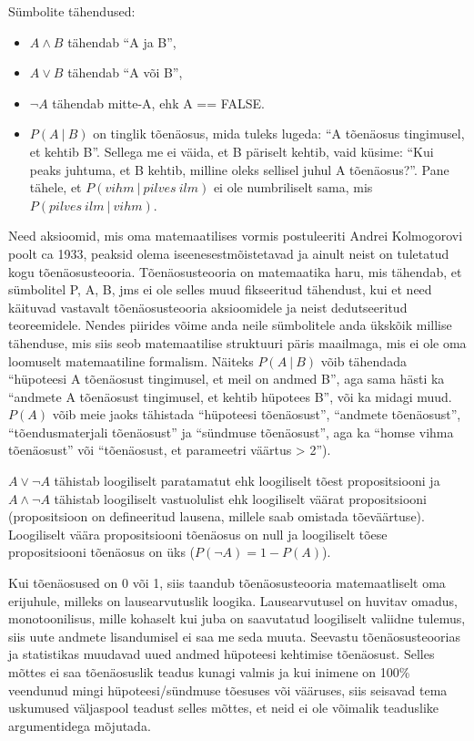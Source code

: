 \documentclass[]{book}
\begin{document}
Sümbolite tähendused:

\begin{itemize}
\item
  \(A \land B\) tähendab ``A ja B'',
\item
  \(A \lor B\) tähendab ``A või B'',
\item
  \(\lnot A\) tähendab mitte-A, ehk A == FALSE.
\item
  \(P(A~ \vert ~B)\) on tinglik tõenäosus, mida tuleks lugeda: ``A
  tõenäosus tingimusel, et kehtib B''. Sellega me ei väida, et B
  päriselt kehtib, vaid küsime: ``Kui peaks juhtuma, et B kehtib,
  milline oleks sellisel juhul A tõenäosus?''. Pane tähele, et
  \(P(vihm~\vert~pilves~ilm)\) ei ole numbriliselt sama, mis
  \(P(pilves~ilm~\vert~vihm)\).
\end{itemize}

Need aksioomid, mis oma matemaatilises vormis postuleeriti Andrei
Kolmogorovi poolt ca 1933, peaksid olema iseenesestmõistetavad ja ainult
neist on tuletatud kogu tõenäosusteooria. Tõenäosusteooria on
matemaatika haru, mis tähendab, et sümbolitel P, A, B, jms ei ole selles
muud fikseeritud tähendust, kui et need käituvad vastavalt
tõenäosusteooria aksioomidele ja neist dedutseeritud teoreemidele.
Nendes piirides võime anda neile sümbolitele anda ükskõik millise
tähenduse, mis siis seob matemaatilise struktuuri päris maailmaga, mis
ei ole oma loomuselt matemaatiline formalism. Näiteks \(P(A~\vert~B)\)
võib tähendada ``hüpoteesi A tõenäosust tingimusel, et meil on andmed
B'', aga sama hästi ka ``andmete A tõenäosust tingimusel, et kehtib
hüpotees B'', või ka midagi muud. \(P(A)\) võib meie jaoks tähistada
``hüpoteesi tõenäosust'', ``andmete tõenäosust'', ``tõendusmaterjali
tõenäosust'' ja ``sündmuse tõenäosust'', aga ka ``homse vihma
tõenäosust'' või ``tõenäosust, et parameetri väärtus \textgreater{}
2'').

\(A \lor \lnot A\) tähistab loogiliselt paratamatut ehk loogiliselt
tõest propositsiooni ja \(A \land \lnot A\) tähistab loogiliselt
vastuolulist ehk loogiliselt väärat propositsiooni (propositsioon on
defineeritud lausena, millele saab omistada tõeväärtuse). Loogiliselt
väära propositsiooni tõenäosus on null ja loogiliselt tõese
propositsiooni tõenäosus on üks (\(P(\lnot A) = 1 - P(A)\)).

Kui tõenäosused on 0 või 1, siis taandub tõenäosusteooria matemaatliselt
oma erijuhule, milleks on lausearvutuslik loogika. Lausearvutusel on
huvitav omadus, monotoonilisus, mille kohaselt kui juba on saavutatud
loogiliselt valiidne tulemus, siis uute andmete lisandumisel ei saa me
seda muuta. Seevastu tõenäosusteoorias ja statistikas muudavad uued
andmed hüpoteesi kehtimise tõenäosust. Selles mõttes ei saa tõenäosuslik
teadus kunagi valmis ja kui inimene on 100\% veendunud mingi
hüpoteesi/sündmuse tõesuses või vääruses, siis seisavad tema uskumused
väljaspool teadust selles mõttes, et neid ei ole võimalik teaduslike
argumentidega mõjutada.
\end{document}
